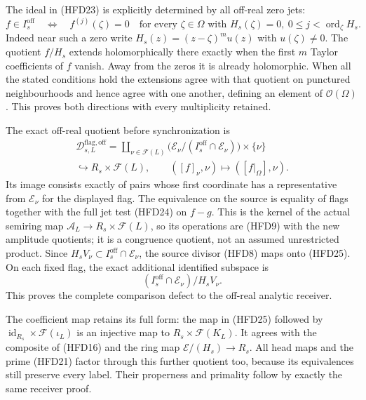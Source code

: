 The ideal in (HFD23) is explicitly determined
by all off-real zero jets:
\begin{equation}\tag{HFD24}
 f\in I_s^{\mathrm{off}}
 \quad\Longleftrightarrow\quad
 f^{(j)}(\zeta)=0
 \quad\text{for every }\zeta\in\Omega
       \text{ with }H_s(\zeta)=0,\
          0\le j<\operatorname{ord}_{\zeta}H_s .
\end{equation}
Indeed near such a zero write
$H_s(z)=(z-\zeta)^m u(z)$ with $u(\zeta)\ne0$.
The quotient $f/H_s$ extends holomorphically
there exactly when the first $m$ Taylor
coefficients of $f$ vanish.
Away from the zeros it is already holomorphic.
When all the stated conditions hold the
extensions agree with that quotient on
punctured neighbourhoods and hence agree
with one another, defining an element of
$\mathcal O(\Omega)$. This proves both
directions with every multiplicity retained.

The exact off-real quotient before synchronization is
\begin{equation}\tag{HFD25}
 \begin{gathered}
 \mathcal D^{\mathrm{flag,off}}_{s,L}
  =\coprod_{\nu\in\mathcal F(L)}
       \bigl(\mathcal E_\nu/
          (I_s^{\mathrm{off}}\cap\mathcal E_\nu)\bigr)
                                               \times\{\nu\}\\
  \hookrightarrow R_s\times\mathcal F(L),\qquad
   ([f]_\nu,\nu)\longmapsto([f|_\Omega],\nu).
 \end{gathered}
\end{equation}
Its image consists exactly of pairs whose
first coordinate has a representative from
$\mathcal E_\nu$ for the displayed flag.
The equivalence on the source is equality
of flags together with the full jet test
(HFD24) on $f-g$. This is the kernel of
the actual semiring map
$\mathcal A_L\to R_s\times\mathcal F(L)$,
so its operations are (HFD9) with the
new amplitude quotients; it is a
congruence quotient, not an assumed
unrestricted product.
Since $H_sV_\nu\subset I_s^{\mathrm{off}}
\cap\mathcal E_\nu$, the source divisor
(HFD8) maps onto (HFD25).
On each fixed flag, the exact additional
identified subspace is
\[
 (I_s^{\mathrm{off}}\cap\mathcal E_\nu)/
                                     H_sV_\nu .
 \tag{HFD26}
\]
This proves the complete comparison defect
to the off-real analytic receiver.

The coefficient map retains its full form:
the map in (HFD25) followed by
$\operatorname{id}_{R_s}\times\mathcal F(\iota_L)$
is an injective map to
$R_s\times\mathcal F(K_L)$.
It agrees with the composite of (HFD16)
and the ring map
$\mathcal E/(H_s)\to R_s$.
All head maps and the prime (HFD21)
factor through this further quotient too,
because its equivalences still preserve
every label. Their properness and primality
follow by exactly the same receiver proof.

